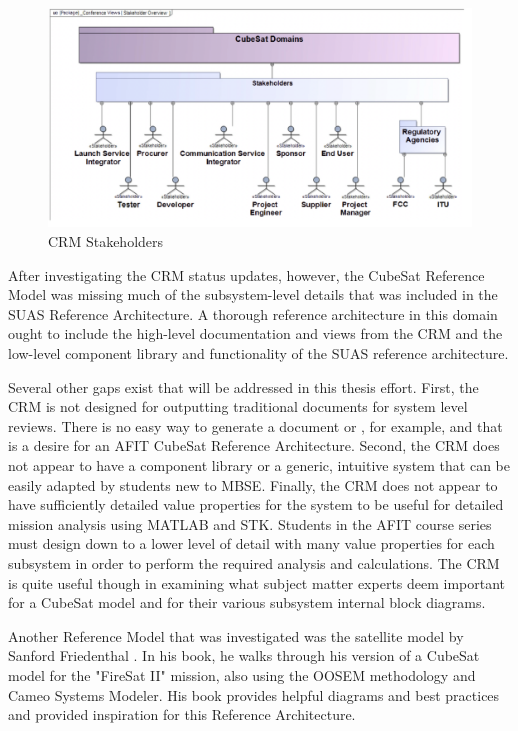 \begin{figure}[H]
    \centering
    \includegraphics[width=\textwidth]{Thesis/Literature_Review/Lit Review Figures/CubeSat Stakeholders.png}
    \caption{CRM Stakeholders}
    \label{fig:CRM Stakeholders}
\end{figure}

After investigating the CRM status updates, however, the CubeSat Reference Model was missing much of the subsystem-level details that was included in the SUAS Reference Architecture. A thorough reference architecture in this domain ought to include the high-level documentation and views from the CRM and the low-level component library and functionality of the SUAS reference architecture. 

Several other gaps exist that will be addressed in this thesis effort. First, the CRM is not designed for outputting traditional documents for system level reviews. There is no easy way to generate a  document or , for example, and that is a desire for an AFIT CubeSat Reference Architecture. Second, the CRM does not appear to have a component library or a generic, intuitive system that can be easily adapted by students new to MBSE. Finally, the CRM does not appear to have sufficiently detailed value properties for the system to be useful for detailed mission analysis using MATLAB and STK. Students in the AFIT course series must design down to a lower level of detail with many value properties for each subsystem in order to perform the required analysis and calculations. The CRM is quite useful though in examining what subject matter experts deem important for a CubeSat model and for their various subsystem internal block diagrams. 

Another Reference Model that was investigated was the satellite model by Sanford Friedenthal \citep{FriedenthalArchitectingSpacecraft}. In his book, he walks through his version of a CubeSat model for the "FireSat II" mission, also using the OOSEM methodology and Cameo Systems Modeler. His book provides helpful diagrams and best practices and provided inspiration for this Reference Architecture. 